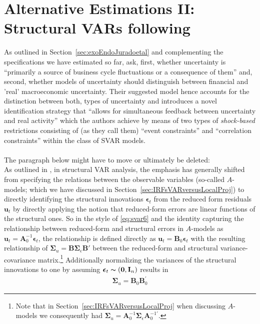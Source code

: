 \documentclass[a4paper,11pt,listof=nochaptergap,oneside,pointednumbers,bibtotoc,bigheadings,liststotoc]{scrbook}
\theoremstyle{mysatz}
\theoremstyle{mydefinition}
\theoremstyle{mybemerkung}
\newcommand{\vect}[1]{\boldsymbol{\mathbf{#1}}}
\begin{document}
\section{Alternative Estimations II: Structural VARs following \citet{ludvigsonetal:18}}
\label{sec:ludvigsonetal18}
As outlined in Section~\ref{sec:exoEndoJuradoetal} and complementing the specifications we have estimated so far, \citet[p. 2]{ludvigsonetal:18} ask, first, whether uncertainty is ``primarily a source of business cycle fluctuations or a consequence of them'' and, second, whether models of uncertainty should distinguish between financial and 'real' macroeconomic uncertainty. Their suggested model hence accounts for the distinction between both, types of uncertainty and introduces a novel identification strategy that ``allows for simultaneous feedback between uncertainty and real activity'' which the authors achieve by means of two types of \textit{shock-based} restrictions consisting of (as they call them) ``event constraints'' and ``correlation constraints'' within the class of SVAR models.\\
\\
The paragraph below might have to move or ultimately be deleted:\\
As outlined in \citet{lutkepohl:05}, in structural VAR analysis, the emphasis has generally shifted from specifying the relations between the observable variables (so-called $A$-models; which we have discussed in Section~\ref{sec:IRFsVARversusLocalProj}) to directly identifying the structural innovations $\vect{\epsilon}_t$ from the reduced form residuals $\vect{u}_t$ by directly applying the notion that reduced-form errors are linear functions of the structural ones. So in the style of \ref{eq:svar6} and the identity capturing the relationship between reduced-form and structural errors in $A$-models as $\vect{u}_t = \vect{A}_0^{-1}\vect{\epsilon}_t$, the relationship is defined directly as $\vect{u}_t = \vect{B}_0\vect{\epsilon}_t$ with the resulting relationship of $\vect{\Sigma}_u = \vect{B}\vect{\Sigma}_\epsilon\vect{B}'$ between the reduced-form and structural variance-covariance matrix.\footnote{Note that in Section~\ref{sec:IRFsVARversusLocalProj} when discussing $A$-models we consequently had $\vect{\Sigma}_u = \vect{A}_0^{-1}\vect{\Sigma}_\epsilon\vect{A}_0^{-1'}$.} Additionally normalizing the variances of the structural innovations to one by assuming $\vect{\epsilon}_t  \thicksim (\vect{0}, \vect{I}_n)$ results in 
	\begin{equation} \label{eq:svar_ludvig2}
	\begin{split}
		\vect{\Sigma}_u = \vect{B}_0 \vect{B}_0^'
	\end{split}
	\end{equation}
\end{document}
